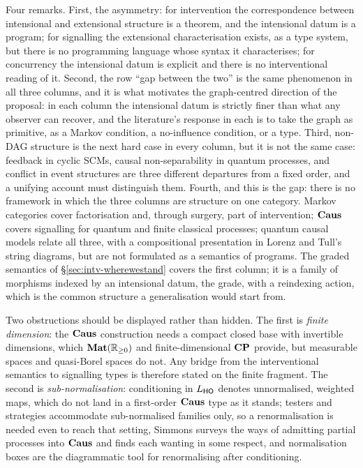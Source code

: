 Four remarks. First, the asymmetry: for intervention the correspondence between intensional and extensional structure is a theorem, and the intensional datum is a program; for signalling the extensional characterisation exists, as a type system, but there is no programming language whose syntax it characterises; for concurrency the intensional datum is explicit and there is no interventional reading of it. Second, the row ``gap between the two'' is the same phenomenon in all three columns, and it is what motivates the graph-centred direction of the proposal: in each column the intensional datum is strictly finer than what any observer can recover, and the literature's response in each is to take the graph as primitive, as a Markov condition, a no-influence condition, or a type. Third, non-DAG structure is the next hard case in every column, but it is not the same case: feedback in cyclic SCMs, causal non-separability in quantum processes, and conflict in event structures are three different departures from a fixed order, and a unifying account must distinguish them. Fourth, and this is the gap: there is no framework in which the three columns are structure on one category. Markov categories cover factorisation and, through surgery, part of intervention; $\mathbf{Caus}$ covers signalling for quantum and finite classical processes; quantum causal models relate all three, with a compositional presentation in Lorenz and Tull's string diagrams, but are not formulated as a semantics of programs. The graded semantics of \S\ref{sec:intv-wherewestand} covers the first column; it is a family of morphisms indexed by an intensional datum, the grade, with a reindexing action, which is the common structure a generalisation would start from.

Two obstructions should be displayed rather than hidden. The first is \emph{finite dimension}: the $\mathbf{Caus}$ construction needs a compact closed base with invertible dimensions, which $\mathbf{Mat}(\mathbb{R}_{\geq 0})$ and finite-dimensional $\mathbf{CP}$ provide, but measurable spaces and quasi-Borel spaces do not. Any bridge from the interventional semantics to signalling types is therefore stated on the finite fragment. The second is \emph{sub-normalisation}: conditioning in $L_{\mathsf{HO}}$ denotes unnormalised, weighted maps, which do not land in a first-order $\mathbf{Caus}$ type as it stands; testers and strategies \cite{chiribella2009networks,gutoski2007games} accommodate sub-normalised families only, so a renormalisation is needed even to reach that setting, Simmons \cite{simmons2024thesis} surveys the ways of admitting partial processes into $\mathbf{Caus}$ and finds each wanting in some respect, and normalisation boxes \cite{jacobsszelesstein2025inference} are the diagrammatic tool for renormalising after conditioning.
